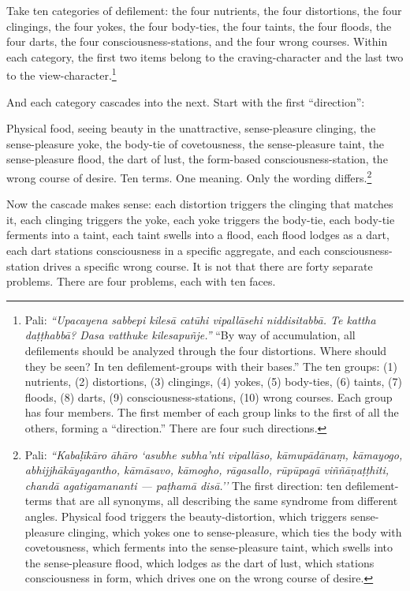 Take ten categories of defilement: the four nutrients, the four distortions, the four clingings, the four yokes, the four body-ties, the four taints, the four floods, the four darts, the four consciousness-stations, and the four wrong courses. Within each category, the first two items belong to the craving-character and the last two to the view-character.\footnote{Pali: \textit{``Upacayena sabbepi kilesā catūhi vipallāsehi niddisitabbā. Te kattha daṭṭhabbā? Dasa vatthuke kilesapuñje.''} ``By way of accumulation, all defilements should be analyzed through the four distortions. Where should they be seen? In ten defilement-groups with their bases.'' The ten groups: (1) nutrients, (2) distortions, (3) clingings, (4) yokes, (5) body-ties, (6) taints, (7) floods, (8) darts, (9) consciousness-stations, (10) wrong courses. Each group has four members. The first member of each group links to the first of all the others, forming a ``direction.'' There are four such directions.}

And each category cascades into the next. Start with the first ``direction'':

Physical food, seeing beauty in the unattractive, sense-pleasure clinging, the sense-pleasure yoke, the body-tie of covetousness, the sense-pleasure taint, the sense-pleasure flood, the dart of lust, the form-based consciousness-station, the wrong course of desire. Ten terms. One meaning. Only the wording differs.\footnote{Pali: \textit{``Kabaḷīkāro āhāro `asubhe subha'nti vipallāso, kāmupādānaṃ, kāmayogo, abhijjhākāyagantho, kāmāsavo, kāmogho, rāgasallo, rūpūpagā viññāṇaṭṭhiti, chandā agatigamananti --- paṭhamā disā.''} The first direction: ten defilement-terms that are all synonyms, all describing the same syndrome from different angles. Physical food triggers the beauty-distortion, which triggers sense-pleasure clinging, which yokes one to sense-pleasure, which ties the body with covetousness, which ferments into the sense-pleasure taint, which swells into the sense-pleasure flood, which lodges as the dart of lust, which stations consciousness in form, which drives one on the wrong course of desire.}

Now the cascade makes sense: each distortion triggers the clinging that matches it, each clinging triggers the yoke, each yoke triggers the body-tie, each body-tie ferments into a taint, each taint swells into a flood, each flood lodges as a dart, each dart stations consciousness in a specific aggregate, and each consciousness-station drives a specific wrong course. It is not that there are forty separate problems. There are four problems, each with ten faces.


